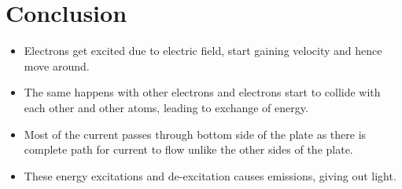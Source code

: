 \documentclass[11pt, a4paper]{article}
\begin{document}
    \section{Conclusion}
    \begin{itemize}
    \item
    Electrons get excited due to electric field, start gaining velocity and hence move around.
    
    \item
    The same happens with other electrons and electrons start to collide with each other and other atoms, leading to exchange of energy.
    
    \item
    Most of the current passes through bottom side of the plate as there is complete path for current to flow unlike the other sides of the plate.
    \item
    These energy excitations and de-excitation causes emissions, giving out light. 
    
    \end{itemize}    
\end{document}
